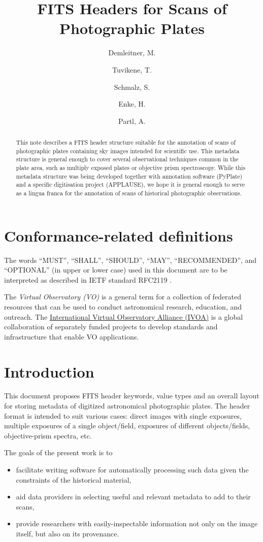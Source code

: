 \documentclass[11pt]{ivoa}
\title{FITS Headers for Scans of Photographic Plates}
\author{Demleitner, M.}
\author{Tuvikene, T.}
\author{Schmalz, S.}
\author{Enke, H.}
\author{Partl, A.}
\begin{document}
\begin{abstract}
This note describes a FITS header structure suitable for the annotation
of scans of photographic plates containing sky images intended for
scientific use.  This metadata structure is general enough to cover
several observational techniques common in the plate area, such as
multiply exposed plates or objective prism spectroscopy.  While this
metadata structure was being developed together with annotation software
(PyPlate) and a specific digitisation project
(APPLAUSE), we hope it is general enough to serve as a lingua franca for
the annotation of scans of historical photographic observations.

\end{abstract}


\section*{Conformance-related definitions}

The words ``MUST'', ``SHALL'', ``SHOULD'', ``MAY'', ``RECOMMENDED'', and
``OPTIONAL'' (in upper or lower case) used in this document are to be
interpreted as described in IETF standard RFC2119 \citep{std:RFC2119}.

The \emph{Virtual Observatory (VO)} is a
general term for a collection of federated resources that can be used
to conduct astronomical research, education, and outreach.
The \href{https://www.ivoa.net}{International
Virtual Observatory Alliance (IVOA)} is a global
collaboration of separately funded projects to develop standards and
infrastructure that enable VO applications.


\section{Introduction}

This document  proposes FITS \citep{std:FITS} header keywords, value
types and an overall layout for storing metadata of digitized
astronomical photographic plates. The header format is intended to suit
various cases: direct images with single exposures, multiple exposures
of a single object/field, exposures of different objects/fields,
objective-prism spectra, etc.

The goals of the present work is to 

\begin{itemize}
\item facilitate writing software for automatically processing such data
given the constraints of the historical material,

\item aid data providers in selecting useful and relevant metadata to
add to their scans,

\item provide researchers with easily-inspectable information not only
on the image itself, but also on its provenance.
\end{itemize}
\end{document}

